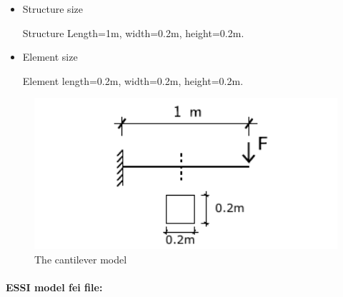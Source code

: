 \begin{itemize}
  \item Structure size

    Structure Length=1m, width=0.2m, height=0.2m.

  \item Element size

    Element length=0.2m, width=0.2m, height=0.2m.
\end{itemize}

\begin{figure}[!htb]
  \centering
  \includegraphics[width=12cm]{./Figure-files/_Chapter_Appendix_Illustrative_Examples/cantilever.pdf}
  \caption{The cantilever model}
\end{figure}


\paragraph{ESSI model fei file: } ~

